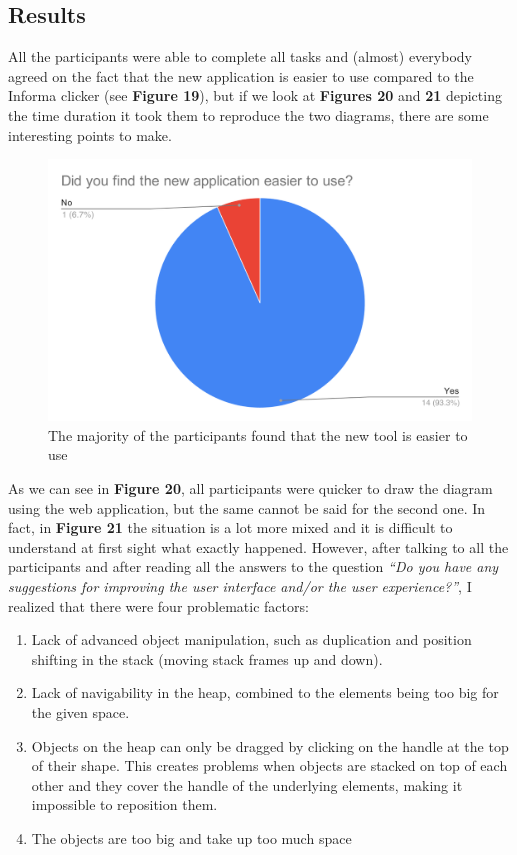 \documentclass[]{usiinfbachelorproject}
\begin{document}
\vspace{\fill}
\pagebreak

\subsection{Results}

All the participants were able to complete all tasks and (almost) everybody agreed on the fact that the new application is easier to use compared to the Informa clicker (see \textbf{Figure 19}), but if we look at \textbf{Figures 20} and \textbf{21} depicting the time duration it took them to reproduce the two diagrams, there are some interesting points to make.

\begin{figure}[h!]
\centering
\includegraphics[scale=0.45]{figures/ease-of-use.png}
\caption {The majority of the participants found that the new tool is easier to use}
\end{figure}

\bigskip

\noindent As we can see in \textbf{Figure 20}, all participants were quicker to draw the diagram using the web application, but the same cannot be said for the second one. In fact, in \textbf{Figure 21} the situation is a lot more mixed and it is difficult to understand at first sight what exactly happened. However, after talking to all the participants and after reading all the answers to the question \emph{``Do you have any suggestions for improving the user interface and/or the user experience?''}, I realized that there were four problematic factors:

\begin{enumerate}
	\item Lack of advanced object manipulation, such as duplication and position shifting in the stack (moving stack frames up and down).
	\item Lack of navigability in the heap, combined to the elements being too big for the given space.
	\item Objects on the heap can only be dragged by clicking on the handle at the top of their shape. This creates problems when objects are stacked on top of each other and they cover the handle of the underlying elements, making it impossible to reposition them.
	\item The objects are too big and take up too much space
\end{enumerate}
\end{document}
